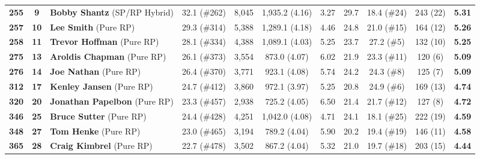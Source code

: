 \documentclass[11pt,letterpaper]{article}
\theoremstyle{plain}
\theoremstyle{definition}
\theoremstyle{remark}
\begin{document}
\begin{table}[htbp]
{\begin{tabular}{@{}cclcccccccc@{}}
\textbf{255} & \textbf{9} & \textbf{Bobby Shantz} (SP/RP Hybrid) & 32.1 (\#262) & 8,045 & 1,935.2 (4.16) & 3.27 & 29.7 & 18.4 (\#24) & 243 (22) & \textbf{5.31} \\
\textbf{257} & \textbf{10} & \textbf{Lee Smith} (Pure RP) & 29.3 (\#314) & 5,388 & 1,289.1 (4.18) & 4.46 & 24.8 & 21.0 (\#15) & 164 (12) & \textbf{5.26} \\
\textbf{258} & \textbf{11} & \textbf{Trevor Hoffman} (Pure RP) & 28.1 (\#334) & 4,388 & 1,089.1 (4.03) & 5.25 & 23.7 & 27.2 (\#5) & 132 (10) & \textbf{5.25} \\
\textbf{275} & \textbf{13} & \textbf{Aroldis Chapman} (Pure RP) & 26.1 (\#373) & 3,554 & 873.0 (4.07) & 6.02 & 21.9 & 23.3 (\#11) & 120 (6) & \textbf{5.09} \\
\textbf{276} & \textbf{14} & \textbf{Joe Nathan} (Pure RP) & 26.4 (\#370) & 3,771 & 923.1 (4.08) & 5.74 & 24.2 & 24.3 (\#8) & 125 (7) & \textbf{5.09} \\
\textbf{312} & \textbf{17} & \textbf{Kenley Jansen} (Pure RP) & 24.7 (\#412) & 3,860 & 972.1 (3.97) & 5.25 & 20.8 & 24.9 (\#6) & 169 (13) & \textbf{4.74} \\
\textbf{320} & \textbf{20} & \textbf{Jonathan Papelbon} (Pure RP) & 23.3 (\#457) & 2,938 & 725.2 (4.05) & 6.50 & 21.4 & 21.7 (\#12) & 127 (8) & \textbf{4.72} \\
\textbf{346} & \textbf{25} & \textbf{Bruce Sutter} (Pure RP) & 24.4 (\#428) & 4,251 & 1,042.0 (4.08) & 4.71 & 24.1 & 18.1 (\#25) & 222 (19) & \textbf{4.59} \\
\textbf{348} & \textbf{27} & \textbf{Tom Henke} (Pure RP) & 23.0 (\#465) & 3,194 & 789.2 (4.04) & 5.90 & 20.2 & 19.4 (\#19) & 146 (11) & \textbf{4.58} \\
\textbf{365} & \textbf{28} & \textbf{Craig Kimbrel} (Pure RP) & 22.7 (\#478) & 3,502 & 867.2 (4.04) & 5.32 & 21.0 & 19.7 (\#18) & 203 (15) & \textbf{4.44} \\
\bottomrule
\end{tabular}%
}
\end{table}
\end{document}
